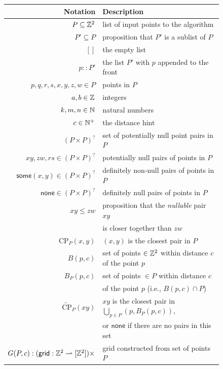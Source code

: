 \documentclass{article}
\begin{document}
\begin{figure}[H]
\begin{center}\label{fig:notation_summary}
\begin{tabular} {|| r | l ||}
  \hline
  Notation & Description \\
  \hline
  \hline
  $P \subseteq \mathbb{Z}^2$ & list of input points to the algorithm \\
  \hline
  $P' \subseteq P$ & proposition that $P'$ is a sublist of $P$ \\
  \hline
  $[]$ & the empty list \\
  \hline
  $p :: P'$ & the list $P'$ with $p$ appended to the front \\
  \hline
  $p, q, r, s, x, y, z, w \in P$ & points in $P$ \\
  \hline
  $a, b \in \mathbb{Z}$ & integers \\
  \hline
  $k, m, n \in \mathbb{N}$ & natural numbers \\
  \hline
  $c \in \mathbb{N}^+$ & the distance hint \\
  \hline
  $(P \times P)^?$ & set of potentially null point pairs in $P$ \\
  \hline
  $x\!y, z\!w, r\!s \in (P \times P)^?$ & potentially null pairs of points in $P$ \\
  \hline
  $\mathsf{some}(x, y) \in (P \times P)^?$ & definitely non-null pairs of points in $P$ \\
  \hline
  $\mathsf{none} \in (P \times P)^?$ & definitely null pairs of points in $P$ \\
  \hline
  $x\!y \leq z\!w$ & proposition that the \textit{nullable} pair $x\!y$ \\ & is closer together than $z\!w$ \\
  \hline
  $\text{CP}_P(x, y)$ & $(x, y)$ is the closest pair in $P$ \\
  \hline
  $B(p, c)$ & set of points $\in \mathbb{Z}^2$ within distance $c$ of the point $p$ \\
  \hline
  $B_P(p, c)$ & set of points $\in P$ within distance $c$ \\ & of the point $p$ (i.e., $B(p, c) \cap P$) \\
  \hline
  $\widetilde{\text{CP}}_P(x\!y)$ & $x\!y$ is the closest pair in $\bigcup_{p \in P} \left(p, B_P(p, c)\right)$, \\ & or $\mathsf{none}$ if there are no pairs in this set \\
  \hline
  $G(P, c) : (\mathsf{grid} : \mathbb{Z}^2 \rightharpoonup [\mathbb{Z}^2]) \times$ & grid constructed from set of points $P$ \\

\end{tabular}
\end{center}
\end{figure}
\end{document}
